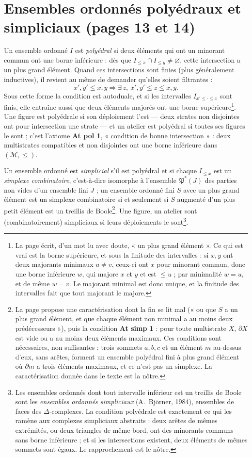 \documentclass[11pt,a4paper]{article}
\begin{document}
\section*{Ensembles ordonnés polyédraux et simpliciaux (pages 13 et 14)}

Un ensemble ordonné $I$ est \emph{polyédral} si deux éléments qui ont un minorant
commun ont une borne inférieure : dès que $I_{\leq x} \cap I_{\leq y} \neq
\varnothing$, cette intersection a un plus grand élément. Quand ces
intersections sont finies (plus généralement inductives), il revient au même de
demander qu'elles soient filtrantes :
\[
x', y' \leq x, y \Longrightarrow \exists\, z,\ x', y' \leq z \leq x, y .
\]
Sous cette forme la condition est autoduale, et si les intervalles
$I_{x' \leq \cdot \leq x}$ sont finis, elle entraîne aussi que deux éléments
majorés ont une borne supérieure\footnote{La page écrit, d'un mot lu avec doute,
« un plus grand élément ». Ce qui est vrai est la borne supérieure, et sous la
finitude des intervalles : si $x, y$ ont deux majorants minimaux $u \neq v$,
ceux-ci ont $x$ pour minorant commun, donc une borne inférieure $w$, qui majore
$x$ et $y$ et est $\leq u$ ; par minimalité $w = u$, et de même $w = v$. Le
majorant minimal est donc unique, et la finitude des intervalles fait que tout
majorant le majore.}. Une figure est polyédrale si son déploiement l'est ---
deux strates non disjointes ont pour intersection une strate --- et un atelier
est polyédral si toutes ses figures le sont ; c'est l'axiome \textbf{At pol 1},
« condition de bonne intersection » : deux multistrates compatibles et non
disjointes ont une borne inférieure dans $(\mathcal{M}, \leq)$.

Un ensemble ordonné est \emph{simplicial} s'il est polyédral et si chaque $I_{\leq
x}$ est un \emph{simplexe combinatoire}, c'est-à-dire isomorphe à l'ensemble
$\mathfrak{P}^{*}(J)$ des parties non vides d'un ensemble fini $J$ ; un ensemble
ordonné fini $S$ avec un plus grand élément est un simplexe combinatoire si et
seulement si $S$ augmenté d'un plus petit élément est un treillis de
Boole\footnote{La page propose une caractérisation dont la fin se lit mal (« ou
que $S$ a un plus grand élément, et que chaque élément non minimal a au moins
deux prédécesseurs »), puis la condition \textbf{At simp 1} : pour toute
multistrate $X$, $\partial X$ est vide ou a au moins deux éléments maximaux.
Ces conditions sont nécessaires, non suffisantes : trois sommets $a, b, c$ et un
élément $m$ au-dessus d'eux, sans arêtes, forment un ensemble polyédral fini à
plus grand élément où $\partial m$ a trois éléments maximaux, et ce n'est pas un
simplexe. La caractérisation donnée dans le texte est la nôtre.}. Une figure,
un atelier sont (combinatoirement) simpliciaux si leurs déploiements le
sont\footnote{Les ensembles ordonnés dont tout intervalle inférieur est un
treillis de Boole sont les \emph{ensembles ordonnés simpliciaux} (A.~Björner,
1984), ensembles de faces des $\Delta$-complexes. La condition polyédrale est
exactement ce qui les ramène aux complexes simpliciaux abstraits : deux arêtes de
mêmes extrémités, ou deux triangles de même bord, ont des minorants communs sans
borne inférieure ; et si les intersections existent, deux éléments de mêmes
sommets sont égaux. Le rapprochement est le nôtre.}.
\end{document}
